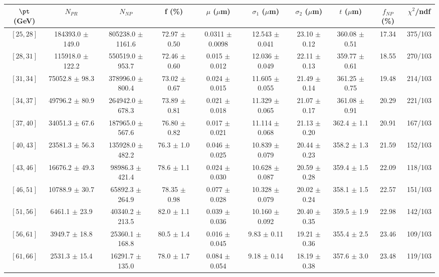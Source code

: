 \begin{tabular}{c||c|c|c|c|c|c|c||c|c}
$\pt$ (GeV) & $N_{PR}$ & $N_{NP}$ & f (\%) & $\mu$ ($\mu$m) & $\sigma_1$ ($\mu$m) & $\sigma_2$ ($\mu$m)  & $t$ ($\mu$m) & $f_{NP}$ (\%) & $\chi^2$/ndf \\
\hline
$[25, 28]$ & 184393.0 $\pm$ 149.0 & 805238.0 $\pm$ 1161.6 & 72.97 $\pm$ 0.50 & 0.0311 $\pm$ 0.0098 & 12.543 $\pm$ 0.041 & 23.10 $\pm$ 0.12 & 360.08 $\pm$ 0.51 & 17.34 & 375/103\\
$[28, 31]$ & 115918.0 $\pm$ 122.2 & 550519.0 $\pm$ 953.7 & 72.46 $\pm$ 0.60 & 0.015 $\pm$ 0.012 & 12.036 $\pm$ 0.049 & 22.11 $\pm$ 0.13 & 359.77 $\pm$ 0.61 & 18.55 & 270/103\\
$[31, 34]$ & 75052.8 $\pm$ 98.3 & 378996.0 $\pm$ 800.4 & 73.02 $\pm$ 0.67 & 0.024 $\pm$ 0.015 & 11.605 $\pm$ 0.055 & 21.49 $\pm$ 0.14 & 361.25 $\pm$ 0.75 & 19.48 & 214/103\\
$[34, 37]$ & 49796.2 $\pm$ 80.9 & 264942.0 $\pm$ 678.3 & 73.89 $\pm$ 0.81 & 0.021 $\pm$ 0.018 & 11.329 $\pm$ 0.065 & 21.07 $\pm$ 0.17 & 361.08 $\pm$ 0.91 & 20.29 & 221/103\\
$[37, 40]$ & 34051.3 $\pm$ 67.6 & 187965.0 $\pm$ 567.6 & 76.80 $\pm$ 0.82 & 0.017 $\pm$ 0.021 & 11.114 $\pm$ 0.068 & 21.13 $\pm$ 0.20 & 362.4 $\pm$ 1.1 & 20.91 & 167/103\\
$[40, 43]$ & 23581.3 $\pm$ 56.3 & 135928.0 $\pm$ 482.2 & 76.3 $\pm$ 1.0 & 0.046 $\pm$ 0.025 & 10.839 $\pm$ 0.079 & 20.44 $\pm$ 0.23 & 358.2 $\pm$ 1.3 & 21.59 & 152/103\\
$[43, 46]$ & 16676.2 $\pm$ 49.3 & 98986.3 $\pm$ 421.4 & 78.6 $\pm$ 1.1 & 0.024 $\pm$ 0.030 & 10.628 $\pm$ 0.087 & 20.59 $\pm$ 0.28 & 359.4 $\pm$ 1.5 & 22.09 & 118/103\\
$[46, 51]$ & 10788.9 $\pm$ 30.7 & 65892.3 $\pm$ 264.9 & 78.35 $\pm$ 0.98 & 0.077 $\pm$ 0.028 & 10.328 $\pm$ 0.079 & 20.02 $\pm$ 0.24 & 358.1 $\pm$ 1.5 & 22.57 & 151/103\\
$[51, 56]$ & 6461.1 $\pm$ 23.9 & 40340.2 $\pm$ 213.5 & 82.0 $\pm$ 1.1 & 0.039 $\pm$ 0.036 & 10.160 $\pm$ 0.092 & 20.40 $\pm$ 0.35 & 359.5 $\pm$ 1.9 & 22.98 & 142/103\\
$[56, 61]$ & 3949.7 $\pm$ 18.8 & 25360.1 $\pm$ 168.8 & 80.5 $\pm$ 1.4 & 0.016 $\pm$ 0.045 & 9.83 $\pm$ 0.11 & 19.21 $\pm$ 0.36 & 355.4 $\pm$ 2.5 & 23.46 & 109/103\\
$[61, 66]$ & 2531.3 $\pm$ 15.4 & 16291.7 $\pm$ 135.0 & 78.0 $\pm$ 1.7 & 0.084 $\pm$ 0.054 & 9.18 $\pm$ 0.14 & 18.19 $\pm$ 0.38 & 357.6 $\pm$ 3.0 & 23.48 & 119/103\\

\end{tabular}
